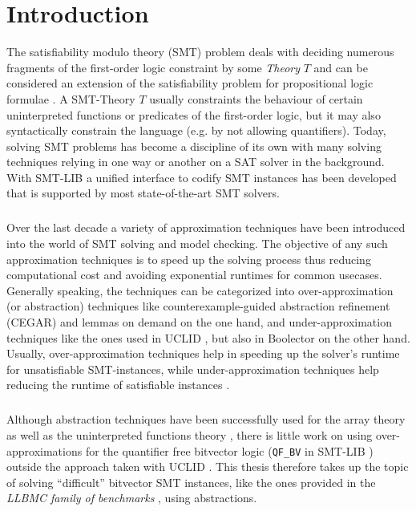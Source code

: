 \chapter{Introduction}
\label{ch:introduction}
The satisfiability modulo theory (SMT) problem deals with deciding numerous fragments of the first-order logic constraint by some \textit{Theory} $T$ \cite{Barrett-Tinelli-SMT} and can be considered an extension of the satisfiability problem for propositional logic formulae \cite{Marques-Silva-PropositionalSATSolving}.
A SMT-Theory $T$ usually constraints the behaviour of certain uninterpreted functions or predicates of the first-order logic, but it may also syntactically constrain the language (e.g. by not allowing quantifiers).
Today, solving SMT problems has become a discipline of its own with many solving techniques relying in one way or another on a SAT solver in the background.
With SMT-LIB \cite{BarFT-SMTLIB} a unified interface to codify SMT instances has been developed that is supported by most state-of-the-art SMT solvers.
\paragraph{}
Over the last decade a variety of approximation techniques have been introduced into the world of SMT solving and model checking.
The objective of any such approximation techniques is to speed up the solving process thus reducing computational cost and avoiding exponential runtimes for common usecases.
Generally speaking, the techniques can be categorized into over-approximation (or abstraction) techniques like counterexample-guided abstraction refinement (CEGAR) \cite{CEGAR} and lemmas on demand \cite{p6-brummayer} on the one hand, and under-approximation techniques like the ones used in UCLID \cite{Bryant2007_Chapter_DecidingBit-VectorArithmeticWi-UCLID}, but also in Boolector \cite{NiemetzPreinerBiere-JSAT15} on the other hand.
Usually, over-approximation techniques help in speeding up the solver's runtime for unsatisfiable SMT-instances, while under-approximation techniques help reducing the runtime of satisfiable instances \cite{Brummayer-PhD}. 
\paragraph{}
Although abstraction techniques have been successfully used for the array theory \cite{p6-brummayer} as well as the uninterpreted functions theory \cite{PreinerNiemetzBiere-DIFTS13,NiemetzPreinerBiere-FMCAD14}, there is little work on using over-approximations for the quantifier free bitvector logic (\texttt{QF\_BV} in SMT-LIB \cite{BarFT-SMTLIB}) outside the approach taken with UCLID \cite{Bryant2007_Chapter_DecidingBit-VectorArithmeticWi-UCLID}.
This thesis therefore takes up the topic of solving \enquote{difficult} bitvector SMT instances, like the ones provided in the \textit{LLBMC family of benchmarks} \cite{sc2017-proceedings}, using abstractions.

